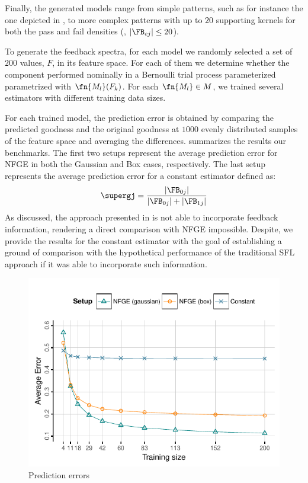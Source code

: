 Finally, the generated models range from simple patterns, such as for
instance the one depicted in
, to more complex patterns
with up to $20$ supporting kernels for both the pass and fail
densities (\ie, $|\FB_{ej}| \le 20$).

To generate the feedback spectra, for each model we randomly selected
a set of $200$ values, $F$, in its feature space.
%
For each of them we determine whether the component performed
nominally in a Bernoulli trial process parameterized parametrized with
$\fn{M_l}(F_k)$.
%
For each $\fn{M_l} \in M$, we trained several estimators with
different training data sizes.

For each trained model, the prediction error is obtained by comparing
the predicted goodness and the original goodness at $1000$ evenly
distributed samples of the feature space and averaging the
differences.
%
 summarizes the results our benchmarks.
%
The first two setups represent the average prediction error for
\ac{NFGE} in both the Gaussian and Box cases, respectively.
%
The last setup represents the average prediction error for a constant
estimator defined as:
\begin{equation}
  \supergj = \frac{|\FB_{0j}|}{|\FB_{0j}| + |\FB_{1j}|}
\end{equation}
As discussed, the approach presented in
 is not able to incorporate
feedback information, rendering a direct comparison with \ac{NFGE}
impossible.
%
Despite, we provide the results for the constant estimator with the
goal of establishing a ground of comparison with the hypothetical
performance of the traditional \ac{SFL} approach if it was able to
incorporate such information.

\begin{figure}
  \includegraphics[scale=1.3,page=1]{figures/nfge/exps/pdfs/synthetic_results.pdf}
  \caption{Prediction errors\label{fig:nfge:synthetic_results}}
\end{figure}



